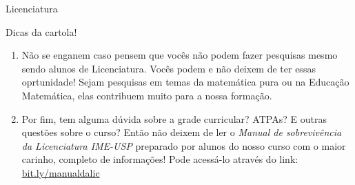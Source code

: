 \begin{subsecao}{Licenciatura}
\begin{subsubsecao}{Dicas da cartola!}
\begin{enumerate}
 \item Não se enganem caso pensem que vocês não podem fazer pesquisas mesmo sendo alunos de
 Licenciatura. Vocês podem e não deixem de ter essas oprtunidade! Sejam pesquisas em temas
 da matemática pura ou na Educação Matemática, elas contribuem muito para a nossa formação.
 \item Por fim, tem alguma dúvida sobre a grade curricular? ATPAs? E outras questões sobre o curso?
Então não deixem de ler o \textit{Manual de sobrevivência da Licenciatura IME-USP} preparado por alunos
do nosso curso com o maior carinho, completo de informações! Pode acessá-lo através
do link: \url{bit.ly/manualdalic}

\end{enumerate}

\end{subsubsecao}

\end{subsecao}
